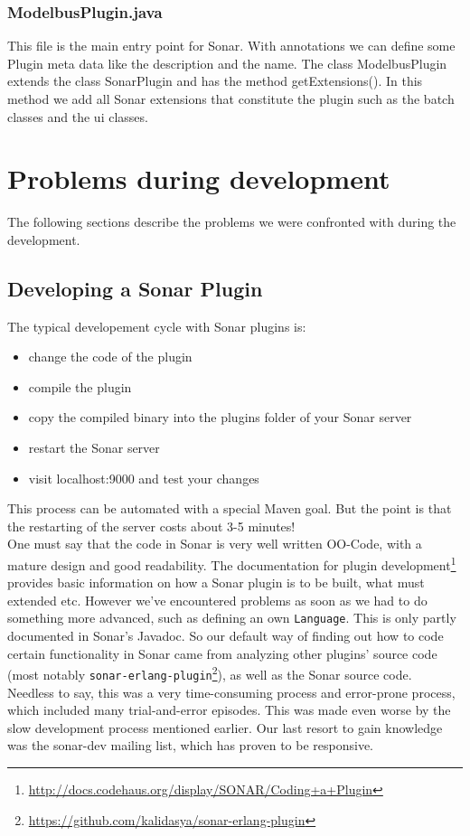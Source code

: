 \subsubsection{ModelbusPlugin.java}

This file is the main entry point for Sonar. With annotations we can
define some Plugin meta data like the description and the name. The
class ModelbusPlugin extends the class SonarPlugin and has the method
getExtensions(). In this method we add all Sonar extensions that 
constitute the plugin such as the batch classes and the ui classes.










\section{Problems during development}

The following sections describe the problems we were confronted with
during the development.

\subsection{Developing a Sonar Plugin}
The typical developement cycle with Sonar plugins is:
\begin{itemize}
	\item change the code of the plugin
	\item compile the plugin
	\item copy the compiled binary into the plugins folder of your Sonar server
	\item restart the Sonar server
	\item visit localhost:9000 and test your changes
\end{itemize}
This process can be automated with a special Maven goal. But the point is that the restarting of the server costs about 3-5 minutes!\\

One must say that the code in Sonar is very well written OO-Code, with
a mature design and good readability. The documentation for plugin
development\footnote{\href{http://docs.codehaus.org/display/SONAR/Coding+a+Plugin}{http://docs.codehaus.org/display/SONAR/Coding+a+Plugin}}
provides basic information on how a Sonar plugin is to be built, what
must extended etc. However we've encountered problems as soon as we
had to do something more advanced, such as defining an own
\texttt{Language}.  This is only partly documented in Sonar's
Javadoc. So our default way of finding out how to code certain
functionality in Sonar came from analyzing other plugins' source code
(most notably
\texttt{sonar-erlang-plugin}\footnote{\href{https://github.com/kalidasya/sonar-erlang-plugin}{https://github.com/kalidasya/sonar-erlang-plugin}}),
as well as the Sonar source code.  Needless to say, this was a very
time-consuming process and error-prone process, which included many
trial-and-error episodes. This was made even worse by the slow
development process mentioned earlier.  Our last resort to gain
knowledge was the sonar-dev mailing list, which has proven to be
responsive.


